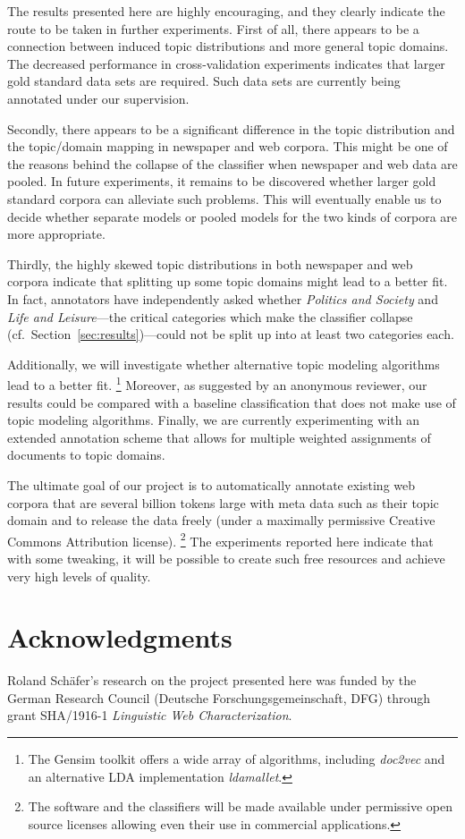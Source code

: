 \documentclass[11pt]{article}
\begin{document}
The results presented here are highly encouraging, and they clearly indicate the route to be taken in further experiments.
First of all, there appears to be a connection between induced topic distributions and more general topic domains.
The decreased performance in cross-validation experiments indicates that larger gold standard data sets are required.
Such data sets are currently being annotated under our supervision.

\pagebreak

Secondly, there appears to be a significant difference in the topic distribution and the topic\slash domain mapping in newspaper and web corpora.
This might be one of the reasons behind the collapse of the classifier when newspaper and web data are pooled.
In future experiments, it remains to be discovered whether larger gold standard corpora can alleviate such problems.
This will eventually enable us to decide whether separate models or pooled models for the two kinds of corpora are more appropriate.

Thirdly, the highly skewed topic distributions in both newspaper and web corpora indicate that splitting up some topic domains might lead to a better fit.
In fact, annotators have independently asked whether \textit{Politics and Society} and \textit{Life and Leisure}---the critical categories which make the classifier collapse (cf.\ Section~\ref{sec:results})---could not be split up into at least two categories each.

Additionally, we will investigate whether alternative topic modeling algorithms lead to a better fit.%
\footnote{The Gensim toolkit offers a wide array of algorithms, including \textit{doc2vec} and an alternative LDA implementation \textit{ldamallet}.}
Moreover, as suggested by an anonymous reviewer, our results could be compared with a baseline classification that does not make use of topic modeling algorithms.
Finally, we are currently experimenting with an extended annotation scheme that allows for multiple weighted assignments of documents to topic domains.

The ultimate goal of our project is to automatically annotate existing web corpora that are several billion tokens large with meta data such as their topic domain and to release the data freely (under a maximally permissive Creative Commons Attribution license).%
\footnote{The software and the classifiers will be made available under permissive open source licenses allowing even their use in commercial applications.}
The experiments reported here indicate that with some tweaking, it will be possible to create such free resources and achieve very high levels of quality.

\section*{Acknowledgments}

Roland Schäfer's research on the project presented here was funded by the German Research Council (Deutsche Forschungsgemeinschaft, DFG) through grant SHA/1916-1 \textit{Linguistic Web Characterization}.



\end{document}

